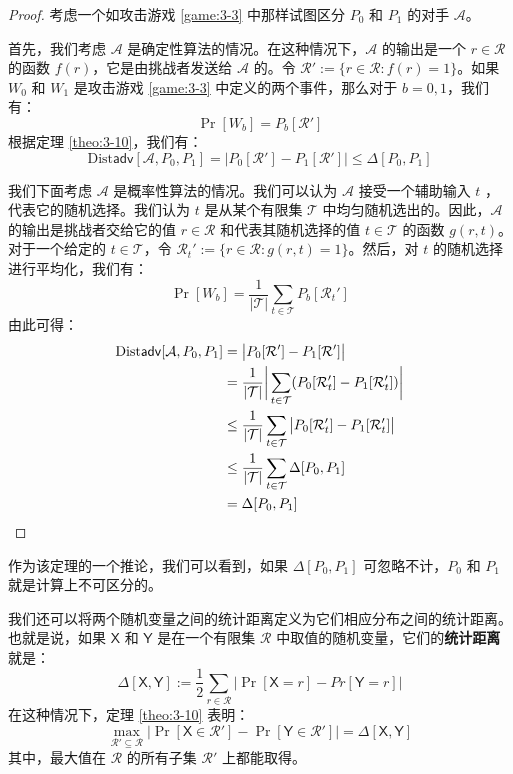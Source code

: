 \begin{proof}
考虑一个如攻击游戏 \ref{game:3-3} 中那样试图区分 $P_0$ 和 $P_1$ 的对手 $\mathcal A$。

首先，我们考虑 $\mathcal A$ 是确定性算法的情况。在这种情况下，$\mathcal A$ 的输出是一个 $r\in\mathcal{R}$ 的函数 $f(r)$，它是由挑战者发送给 $\mathcal A$ 的。令 $\mathcal{R}':=\{r\in\mathcal{R}:f(r)=1\}$。如果 $W_0$ 和 $W_1$ 是攻击游戏 \ref{game:3-3} 中定义的两个事件，那么对于 $b=0,1$，我们有：
\[
\Pr[W_b]=P_b[\mathcal{R}']
\]
根据定理 \ref{theo:3-10}，我们有：
\[
\mathrm{Dist}\mathsf{adv}[\mathcal{A},P_0,P_1]
=\big\lvert
P_0[\mathcal{R}']-P_1[\mathcal{R}']
\big\rvert
\leq\Delta[P_0, P_1]
\]

我们下面考虑 $\mathcal A$ 是概率性算法的情况。我们可以认为 $\mathcal A$ 接受一个辅助输入 $t$ ，代表它的随机选择。我们认为 $t$ 是从某个有限集 $\mathcal{T}$ 中均匀随机选出的。因此，$\mathcal A$ 的输出是挑战者交给它的值 $r\in\mathcal{R}$ 和代表其随机选择的值 $t\in\mathcal{T}$ 的函数 $g(r,t)$。对于一个给定的 $t\in\mathcal{T}$，令 $\mathcal{R}_t':=\{r\in\mathcal{R}:g(r,t)=1\}$。然后，对 $t$ 的随机选择进行平均化，我们有：
\[
\Pr[W_b]
=\frac{1}{|\mathcal{T}|}
\sum_{t\in\mathcal{T}}P_b[\mathcal{R}_t']
\]
由此可得：
\[
\begin{aligned}
{\rm Dist\mathsf{adv}}[\mathcal{A},P_0,P_1]
&=\big\lvert P_0[\mathcal{R}']-P_1[\mathcal{R}']\big\rvert\\
&=\frac{1}{|\mathcal{T}|}\bigg\lvert\sum_{t\in\mathcal{T}}(P_0[\mathcal{R}_t']-P_1[\mathcal{R}_t'])\bigg\rvert\\
&\leq\frac{1}{|\mathcal{T}|}\sum_{t\in\mathcal{T}}\big\lvert P_0[\mathcal{R}_t']-P_1[\mathcal{R}_t']\big\rvert\\
&\leq\frac{1}{|\mathcal{T}|}\sum_{t\in\mathcal{T}}\Delta[P_0,P_1]\\
&=\Delta[P_0,P_1]\qedhere
\end{aligned}
\]
\end{proof}

作为该定理的一个推论，我们可以看到，如果 $\Delta[P_0,P_1]$ 可忽略不计，$P_0$ 和 $P_1$ 就是计算上不可区分的。

\vspace{5pt}

我们还可以将两个随机变量之间的统计距离定义为它们相应分布之间的统计距离。也就是说，如果 $\boldsymbol{\mathsf{X}}$ 和 $\boldsymbol{\mathsf{Y}}$ 是在一个有限集 $\mathcal{R}$ 中取值的随机变量，它们的\textbf{统计距离}就是：
\[
\Delta[\boldsymbol{\mathsf{X}},\boldsymbol{\mathsf{Y}}]
:=
\frac{1}{2}
\sum_{r\in\mathcal{R}}
\big\lvert
\Pr[\boldsymbol{\mathsf{X}}=r]-Pr[\boldsymbol{\mathsf{Y}}=r]
\big\rvert
\]
在这种情况下，定理 \ref{theo:3-10} 表明：
\[
\max_{\mathcal{R}'\subseteq\mathcal{R}}
\big\lvert
\Pr[\boldsymbol{\mathsf{X}}\in\mathcal{R}']-\Pr[\boldsymbol{\mathsf{Y}}\in\mathcal{R}']
\big\rvert
=\Delta[\boldsymbol{\mathsf{X}},\boldsymbol{\mathsf{Y}}]
\]
其中，最大值在 $\mathcal R$ 的所有子集 $\mathcal R'$ 上都能取得。

